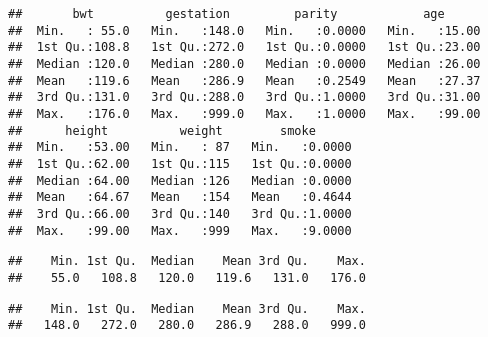\documentclass[
]{article}
\newenvironment{Shaded}{\begin{snugshade}}{\end{snugshade}}
\newcommand{\FunctionTok}[1]{\textcolor[rgb]{0.13,0.29,0.53}{\textbf{#1}}}
\newcommand{\NormalTok}[1]{#1}
\newcommand{\OtherTok}[1]{\textcolor[rgb]{0.56,0.35,0.01}{#1}}
\newcommand{\SpecialCharTok}[1]{\textcolor[rgb]{0.81,0.36,0.00}{\textbf{#1}}}
\begin{document}
\begin{verbatim}
##       bwt          gestation         parity            age       
##  Min.   : 55.0   Min.   :148.0   Min.   :0.0000   Min.   :15.00  
##  1st Qu.:108.8   1st Qu.:272.0   1st Qu.:0.0000   1st Qu.:23.00  
##  Median :120.0   Median :280.0   Median :0.0000   Median :26.00  
##  Mean   :119.6   Mean   :286.9   Mean   :0.2549   Mean   :27.37  
##  3rd Qu.:131.0   3rd Qu.:288.0   3rd Qu.:1.0000   3rd Qu.:31.00  
##  Max.   :176.0   Max.   :999.0   Max.   :1.0000   Max.   :99.00  
##      height          weight        smoke       
##  Min.   :53.00   Min.   : 87   Min.   :0.0000  
##  1st Qu.:62.00   1st Qu.:115   1st Qu.:0.0000  
##  Median :64.00   Median :126   Median :0.0000  
##  Mean   :64.67   Mean   :154   Mean   :0.4644  
##  3rd Qu.:66.00   3rd Qu.:140   3rd Qu.:1.0000  
##  Max.   :99.00   Max.   :999   Max.   :9.0000
\end{verbatim}

\begin{Shaded}
\end{Shaded}

\begin{verbatim}
##    Min. 1st Qu.  Median    Mean 3rd Qu.    Max. 
##    55.0   108.8   120.0   119.6   131.0   176.0
\end{verbatim}

\begin{Shaded}
\end{Shaded}

\begin{verbatim}
##    Min. 1st Qu.  Median    Mean 3rd Qu.    Max. 
##   148.0   272.0   280.0   286.9   288.0   999.0
\end{verbatim}

\begin{Shaded}
\end{Shaded}
\end{document}
